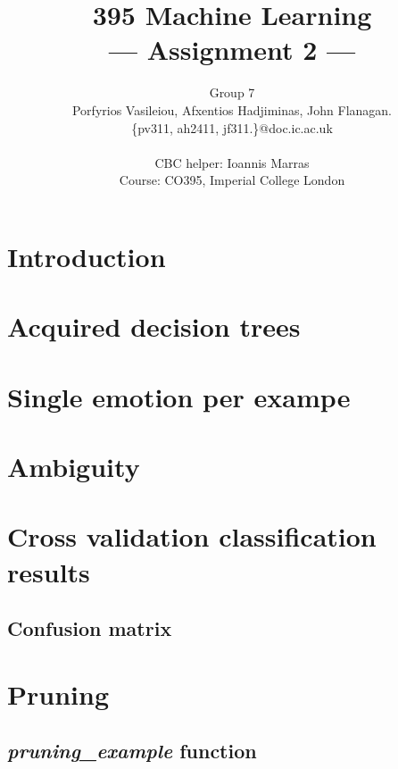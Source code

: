 \documentclass[a4paper,11pt]{article}
\title{395 Machine Learning\\\Large{--- Assignment 2 ---}}
\author{Group 7\\Porfyrios Vasileiou, Afxentios Hadjiminas, John Flanagan.\\
       \{pv311, ah2411, jf311.\}@doc.ic.ac.uk\\ \\
       \small{CBC helper: Ioannis Marras}\\
       \small{Course: CO395, Imperial College London}
}
\begin{document}
\maketitle

\section{Introduction}

\section{Acquired decision trees}
    

\section{Single emotion per exampe}

\section{Ambiguity}

\section{Cross validation classification results}
    \subsection{Confusion matrix}
    

\section{Pruning}
    \subsection{\emph{pruning\_example} function}

%	
%	
\end{document}
